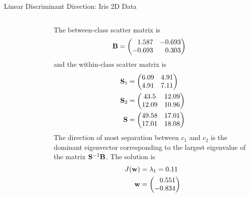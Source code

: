 \begin{frame}{Linear Discriminant Direction: Iris 2D Data}
  \begin{columns}
\begin{figure}[!t]\vspace*{-14pt}
    \centering
\end{figure}

\scriptsize
The between-class scatter matrix is
\begin{align*}
    \bB & = \amatr{r}{1.587 & -0.693\\-0.693 & 0.303}
\end{align*}
and the within-class scatter matrix is
\begin{align*}
    \mathbf{S}_1 & = \begin{pmatrix} 6.09 & 4.91\\4.91 & 7.11 \end{pmatrix}\\
    \mathbf{S}_2 & = \begin{pmatrix} 43.5 & 12.09\\12.09 & 10.96 \end{pmatrix}\\
    \mathbf{S} & = \begin{pmatrix} 49.58 & 17.01\\17.01 & 18.08 \end{pmatrix}
\end{align*}
The direction of most separation between $c_1$ and $c_2$ is the
dominant eigenvector corresponding to the largest eigenvalue of
the matrix $\mathbf{S}^{-1} \mathbf{B}$. The solution is
\begin{align*}
    J(\bw) & = \lambda_1 = 0.11\\
    \bw & = \amatr{r}{0.551\\-0.834}
\end{align*}
\end{columns}
\end{frame}


